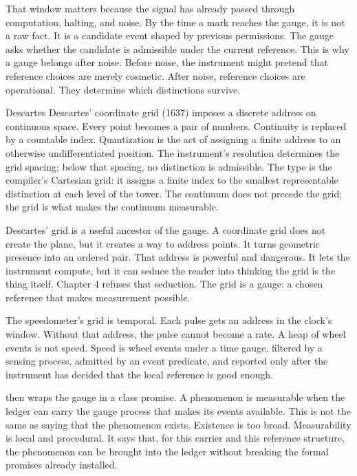 That window matters because the signal has already passed through computation,
halting, and noise. By the time a mark reaches the gauge, it is not a raw fact.
It is a candidate event shaped by previous permissions. The gauge asks whether
the candidate is admissible under the current reference. This is why a gauge
belongs after noise. Before noise, the instrument might pretend that reference
choices are merely cosmetic. After noise, reference choices are operational.
They determine which distinctions survive.

\begin{gphenom}{Descartes}
\label{ph:descartes}
\GPhObs Descartes' coordinate grid (1637) imposes a discrete address on
continuous space. Every point becomes a pair of numbers. Continuity
is replaced by a countable index.
\GPhCon Quantization is the act of assigning a finite address to an otherwise
undifferentiated position. The instrument's resolution determines the
grid spacing; below that spacing, no distinction is admissible.
\GPhSeq The  type is the compiler's Cartesian grid:
it assigns a finite index to the smallest representable distinction at
each level of the tower. The continuum does not precede the grid;
the grid is what makes the continuum measurable.
\end{gphenom}

Descartes' grid is a useful ancestor of the gauge. A coordinate grid does not
create the plane, but it creates a way to address points. It turns geometric
presence into an ordered pair. That address is powerful and dangerous. It lets
the instrument compute, but it can seduce the reader into thinking the grid is
the thing itself. Chapter 4 refuses that seduction. The grid is a gauge: a
chosen reference that makes measurement possible.

The speedometer's grid is temporal. Each pulse gets an address in the clock's
window. Without that address, the pulse cannot become a rate. A heap of wheel
events is not speed. Speed is wheel events under a time gauge, filtered by a
sensing process, admitted by an event predicate, and reported only after the
instrument has decided that the local reference is good enough.

 then wraps the gauge in a class promise. A phenomenon is
measurable when the ledger can carry the gauge process that makes its events
available. This is not the same as saying that the phenomenon exists. Existence
is too broad. Measurability is local and procedural. It says that, for this
carrier and this reference structure, the phenomenon can be brought into the
ledger without breaking the formal promises already installed.

